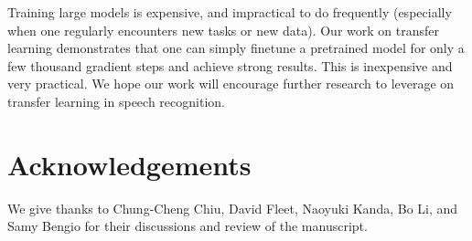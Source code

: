 \documentclass[a4paper]{article}
\begin{document}
Training large models is expensive, and impractical to do frequently (especially when one regularly encounters new tasks or new data). Our work on transfer learning demonstrates that one can simply finetune a pretrained model for only a few thousand gradient steps and achieve strong results. This is inexpensive and very practical. We hope our work will encourage further research to leverage on transfer learning in speech recognition.
 

\section{Acknowledgements}

We give thanks to Chung-Cheng Chiu, David Fleet, Naoyuki Kanda, Bo Li, and Samy Bengio for their  discussions and review of the manuscript.





\end{document}
